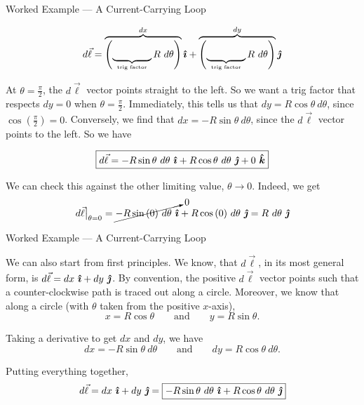 \documentclass{beamer}
\begin{document}
\begin{frame}{Worked Example --- A Current-Carrying Loop}

\begin{equation*}
    d\vec{\ell} = \overbrace{\left( \underbrace{\hspace{4em}}_{\parbox[c]{4em}{\centering \text{\tiny trig factor}}} R\ d\theta \right)}^{dx} \ihat + \overbrace{\left( \underbrace{\hspace{4em}}_{\parbox[c]{4em}{\centering \text{\tiny trig factor}}} R\ d\theta \right)}^{dy} \jhat
\end{equation*}

At $\theta = \frac{\pi}{2}$, the $d\vec{\ell}$ vector points straight to the left. So we want a trig factor that respects $dy = 0$ when $\theta = \frac{\pi}{2}$. Immediately, this tells us that $dy = R\cos{\theta}\ d\theta$, since $\cos{\left(\frac{\pi}{2}\right)} = 0$. Conversely, we find that $dx = -R\sin{\theta}\ d\theta$, since the $d\vec{\ell}$ vector points to the left. So we have

\begin{equation*}
    \boxed{d\vec{\ell} = -R\sin{\theta}\ d\theta\ \ihat + R\cos{\theta}\ d\theta\ \jhat + 0\ \khat}
\end{equation*}

We can check this against the other limiting value, $\theta \to 0$. Indeed, we get
\begin{equation*}
    d\vec{\ell} \big|_{\theta = 0} = \cancelto{0}{-R\sin{(0)}\ d\theta\ \ihat} + {R\cos{(0)}\ d\theta\ \jhat} = R\ d\theta\ \jhat
\end{equation*}

\end{frame}

\begin{frame}{Worked Example --- A Current-Carrying Loop}

We can also start from first principles. We know, that $d\vec{\ell}$, in its most general form, is $d\vec{\ell} = dx\ \bm{\hat{\imath}} + dy\ \bm{\hat{\jmath}}$. By convention, the positive $d\vec{\ell}$ vector points such that a counter-clockwise path is traced out along a circle. Moreover, we know that along a circle (with $\theta$ taken from the positive $x$-axis),
\begin{equation*}
    x = R\cos{\theta} \qquad \text{and} \qquad y = R\sin{\theta}.
\end{equation*}

Taking a derivative to get $dx$ and $dy$, we have
\begin{equation*}
    dx = -R\sin{\theta}\ d\theta \qquad \text{and} \qquad dy = R\cos{\theta}\ d\theta.
\end{equation*}

Putting everything together,
\begin{equation*}
    d\vec{\ell} = dx\ \bm{\hat{\imath}} + dy\ \bm{\hat{\jmath}} = \boxed{-R\sin{\theta}\ d\theta\ \bm{\hat{\imath}} + R\cos{\theta}\ d\theta\ \bm{\hat{\jmath}}}
\end{equation*}

\end{frame}
\end{document}
